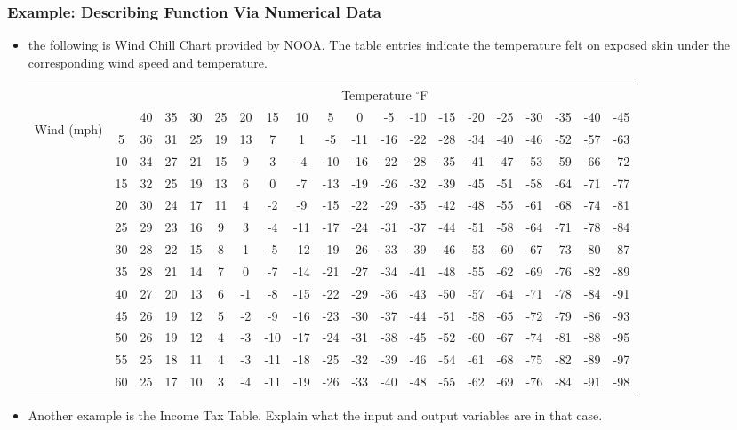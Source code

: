 \begin{frame}
\frametitle{Example: Describing Function Via Numerical Data}
\begin{itemize}
\item the following is Wind Chill Chart provided by NOOA. The table entries indicate the temperature felt on exposed skin under the corresponding wind speed and temperature.

\small
\begin{tabular}{|c@{~}c|@{~}c@{~}c@{~}c@{~}c@{~}c@{~}c@{~}c@{~}c@{~}c@{~}c@{~}c@{~}c@{~}c@{~}c@{~}c@{~}c@{~}c@{~}c@{}|}\hline
&&\multicolumn{18}{c|}{Temperature $^\circ$F}\\
\multirow{12}{0.2cm}{\begin{sideways}Wind (mph)\end{sideways}}    
&& 40 & 35 & 30 & 25 & 20 & 15   & 10  & 5   & 0   & -5  & -10 & -15 & -20 & -25 & -30 & -35 & -40 & -45 \\\hline
& 5  & 36 & 31 & 25 & 19 & 13 &  7   & 1   & -5  & -11 & -16 & -22 & -28 & -34 & -40 & -46 & -52 & -57 & -63 \\
& 10 & 34 & 27 & 21 & 15 & 9  &  3   & -4  & -10 & -16 & -22 & -28 & -35 & -41 & -47 & -53 & -59 & -66 & -72 \\
& 15 & 32 & 25 & 19 & 13 & 6  &  0   & -7  & -13 & -19 & -26 & -32 & -39 & -45 & -51 & -58 & -64 & -71 & -77 \\
& 20 & 30 & 24 & 17 & 11 & 4  & -2   & -9  & -15 & -22 & -29 & -35 & -42 & -48 & -55 & -61 & -68 & -74 & -81 \\
& 25 & 29 & 23 & 16 & 9  & 3  & -4   & -11 & -17 & -24 & -31 & -37 & -44 & -51 & -58 & -64 & -71 & -78 & -84 \\
& 30 & 28 & 22 & 15 & 8  & 1  & -5   & -12 & -19 & -26 & -33 & -39 & -46 & -53 & -60 & -67 & -73 & -80 & -87 \\
& 35 & 28 & 21 & 14 & 7  & 0  & -7   & -14 & -21 & -27 & -34 & -41 & -48 & -55 & -62 & -69 & -76 & -82 & -89 \\
& 40 & 27 & 20 & 13 & 6  & -1 & -8   & -15 & -22 & -29 & -36 & -43 & -50 & -57 & -64 & -71 & -78 & -84 & -91 \\
& 45 & 26 & 19 & 12 & 5  & -2 & -9   & -16 & -23 & -30 & -37 & -44 & -51 & -58 & -65 & -72 & -79 & -86 & -93 \\
& 50 & 26 & 19 & 12 & 4  & -3 & -10  & -17 & -24 & -31 & -38 & -45 & -52 & -60 & -67 & -74 & -81 & -88 & -95 \\
& 55 & 25 & 18 & 11 & 4  & -3 & -11  & -18 & -25 & -32 & -39 & -46 & -54 & -61 & -68 & -75 & -82 & -89 & -97 \\
& 60 & 25 & 17 & 10 & 3  & -4 & -11  & -19 & -26 & -33 & -40 & -48 & -55 & -62 & -69 & -76 & -84 & -91 & -98 \\\hline 
\end{tabular}
\end{itemize}
\end{frame}
\begin{frame}
\begin{itemize}
\item Another example is the Income Tax Table. Explain what the
input and output variables are in that case.
\end{itemize}
\end{frame}